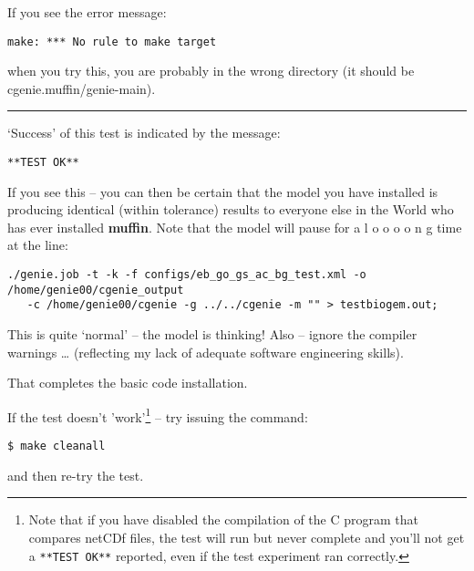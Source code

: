 \documentclass[11pt,fleqn]{book} %
\begin{document}
If you see the error message:
\vspace{-2mm}
\begin{verbatim}
make: *** No rule to make target 
\end{verbatim}
\vspace{-2mm}
when you try this, you are probably in the wrong directory (it should be \textsf{\footnotesize cgenie.muffin/genie-main}).

\vspace{1mm}
\noindent\rule{4cm}{0.5pt}
\vspace{2mm}

\noindent ‘Success’ of this test is indicated by the message:
\vspace{-1mm}
\begin{verbatim}
**TEST OK**
\end{verbatim}
\vspace{-1mm}

\noindent If you see this -- you can then be certain that the model you have installed is producing identical (within tolerance) results to everyone else in the World who has ever installed \textbf{muffin}. Note that the model will pause for a l o o o o n g time at the line:
\vspace{-2mm}
\small
\begin{verbatim}
./genie.job -t -k -f configs/eb_go_gs_ac_bg_test.xml -o /home/genie00/cgenie_output
   -c /home/genie00/cgenie -g ../../cgenie -m "" > testbiogem.out;
\end{verbatim}
\normalsize
\vspace{-2mm}

\noindent This is quite ‘normal’ – the model is thinking! Also -- ignore the compiler warnings … (reflecting my lack of adequate software engineering skills).

That completes the basic code installation.

\newpage

If the test  doesn't 'work'\footnote{Note that if you have disabled the compilation of the C program that compares netCDf files, the test will run but never complete and you'll not get a \texttt{**TEST OK**} reported, even if the test experiment ran correctly.} -- try issuing the command:
\vspace{-2mm}
\begin{verbatim}
$ make cleanall
\end{verbatim}
\vspace{-2mm}

\noindent and then re-try the test. 
\end{document}

